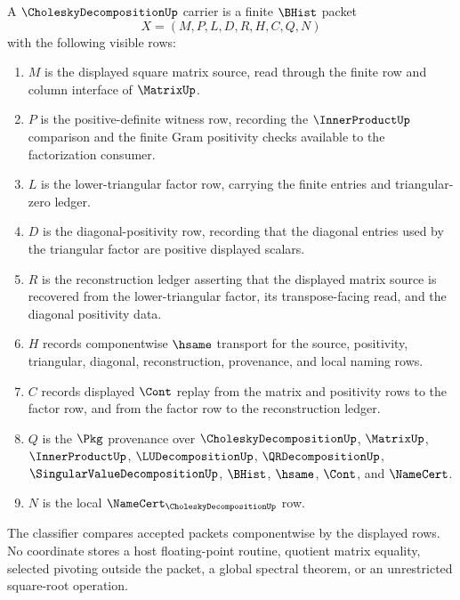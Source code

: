 \begin{definition}
\label{def:cholesky-decomposition-carrier}
A $\CholeskyDecompositionUp$ carrier is a finite $\BHist$ packet
$$
X=(M,P,L,D,R,H,C,Q,N)
$$
with the following visible rows:
\begin{enumerate}
\item $M$ is the displayed square matrix source, read through the finite row and column interface of $\MatrixUp$.
\item $P$ is the positive-definite witness row, recording the $\InnerProductUp$ comparison and the finite Gram positivity checks available to the factorization consumer.
\item $L$ is the lower-triangular factor row, carrying the finite entries and triangular-zero ledger.
\item $D$ is the diagonal-positivity row, recording that the diagonal entries used by the triangular factor are positive displayed scalars.
\item $R$ is the reconstruction ledger asserting that the displayed matrix source is recovered from the lower-triangular factor, its transpose-facing read, and the diagonal positivity data.
\item $H$ records componentwise $\hsame$ transport for the source, positivity, triangular, diagonal, reconstruction, provenance, and local naming rows.
\item $C$ records displayed $\Cont$ replay from the matrix and positivity rows to the factor row, and from the factor row to the reconstruction ledger.
\item $Q$ is the $\Pkg$ provenance over $\CholeskyDecompositionUp$, $\MatrixUp$, $\InnerProductUp$, $\LUDecompositionUp$, $\QRDecompositionUp$, $\SingularValueDecompositionUp$, $\BHist$, $\hsame$, $\Cont$, and $\NameCert$.
\item $N$ is the local $\NameCert_{\CholeskyDecompositionUp}$ row.
\end{enumerate}
The classifier compares accepted packets componentwise by the displayed rows. No coordinate stores a host floating-point routine, quotient matrix equality, selected pivoting outside the packet, a global spectral theorem, or an unrestricted square-root operation.
\end{definition}

